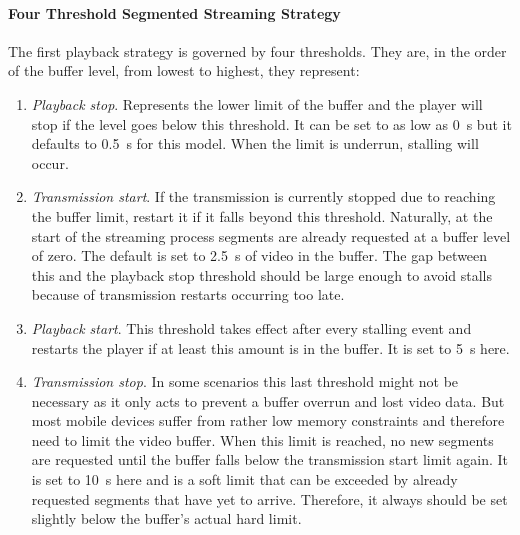 \paragraph{Four Threshold Segmented Streaming Strategy}

The first playback strategy is governed by four thresholds. They are, in the order of the buffer level, from lowest to highest, they represent:
%
\begin{enumerate}
	\item \textit{Playback stop}. Represents the lower limit of the buffer and the player will stop if the level goes below this threshold. It can be set to as low as \SI{0}{\second} but it defaults to \SI{0.5}{\second} for this model. When the limit is underrun, stalling will occur.

	\item \textit{Transmission start}. If the transmission is currently stopped due to reaching the buffer limit, restart it if it falls beyond this threshold. Naturally, at the start of the streaming process segments are already requested at a buffer level of zero. The default is set to \SI{2.5}{\second} of video in the buffer. The gap between this and the playback stop threshold should be large enough to avoid stalls because of transmission restarts occurring too late.

	\item \textit{Playback start}. This threshold takes effect after every stalling event and restarts the player if at least this amount is in the buffer. It is set to \SI{5}{\second} here.

	\item \textit{Transmission stop}. In some scenarios this last threshold might not be necessary as it only acts to prevent a buffer overrun and lost video data. But most mobile devices suffer from rather low memory constraints and therefore need to limit the video buffer. When this limit is reached, no new segments are requested until the buffer falls below the transmission start limit again. It is set to \SI{10}{\second} here and is a soft limit that can be exceeded by already requested segments that have yet to arrive. Therefore, it always should be set slightly below the buffer's actual hard limit.
\end{enumerate}


